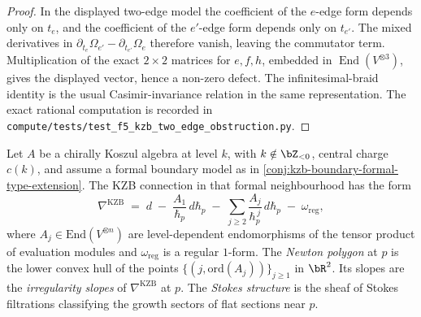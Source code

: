 \begin{proof}
In the displayed two-edge model the coefficient of the \(e\)-edge
form depends only on \(t_e\), and the coefficient of the \(e'\)-edge
form depends only on \(t_{e'}\). The mixed derivatives in
\(\partial_{t_e}\Omega_{e'}-\partial_{t_{e'}}\Omega_e\) therefore
vanish, leaving the commutator term. Multiplication of the exact
\(2\times2\) matrices for \(e,f,h\), embedded in
\(\operatorname{End}(V^{\otimes3})\), gives the displayed vector,
hence a non-zero defect. The infinitesimal-braid identity is the
usual Casimir-invariance relation in the same representation. The
exact rational computation is recorded in
\texttt{compute/tests/test\_f5\_kzb\_two\_edge\_obstruction.py}.
\end{proof}

\begin{definition}
\label{def:newton-stokes}
Let \(A\) be a chirally Koszul algebra at level \(k\), with
\(k \notin \bZ_{<0}\), central charge \(c(k)\), and assume a
formal boundary model as in
\autoref{conj:kzb-boundary-formal-type-extension}. The KZB
connection in that formal neighbourhood has the form
\[
 \nabla^{\mathrm{KZB}}
 \;=\;
 d
 \;-\;
 \frac{A_{1}}{\hbar_{p}}\,d\hbar_{p}
 \;-\;
 \sum_{j \ge 2}
 \frac{A_{j}}{\hbar_{p}^{\,j}}\,d\hbar_{p}
 \;-\;
 \omega_{\mathrm{reg}},
\]
where \(A_{j} \in \mathrm{End}(V^{\otimes n})\) are level-dependent
endomorphisms of the tensor product of evaluation modules and
\(\omega_{\mathrm{reg}}\) is a regular \(1\)-form.
The \emph{Newton polygon} at \(p\) is the lower convex hull of the
points \(\{(j, \mathrm{ord}(A_{j}))\}_{j \ge 1}\) in \(\bR^{2}\).
Its slopes are the \emph{irregularity slopes} of
\(\nabla^{\mathrm{KZB}}\) at \(p\). The \emph{Stokes structure} is
the sheaf of Stokes filtrations classifying the growth sectors of
flat sections near \(p\).
\end{definition}

